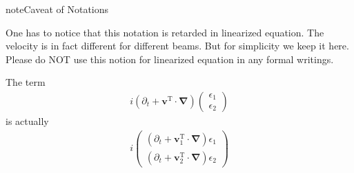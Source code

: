 \documentclass[letterpaper,12pt,english]{sphinxmanual}
\begin{document}
\begin{sphinxadmonition}{note}{Caveat of Notations}

One has to notice that this notation is retarded in linearized equation. The velocity is in fact different for different beams. But for simplicity we keep it here. Please do NOT use this notion for linearized equation in any formal writings.

The term
\begin{equation*}
\begin{split}i (\partial_t+\mathbf v^{\mathrm T}\cdot\boldsymbol\nabla) \begin{pmatrix}
\epsilon_1 \\
\epsilon_2
\end{pmatrix}\end{split}
\end{equation*}
is actually
\begin{equation*}
\begin{split}i\begin{pmatrix}
(\partial_t+\mathbf v_1^{\mathrm T}\cdot\boldsymbol\nabla) \epsilon_1 \\
(\partial_t+\mathbf v_2^{\mathrm T}\cdot\boldsymbol\nabla) \epsilon_2
\end{pmatrix}\end{split}
\end{equation*}\end{sphinxadmonition}
\end{document}
